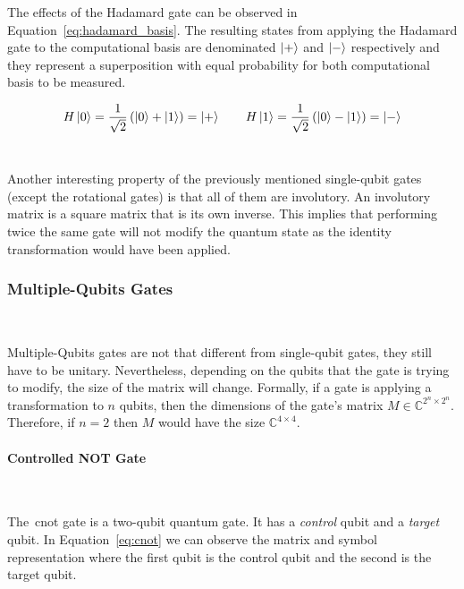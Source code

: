 The effects of the Hadamard gate can be observed in
Equation~\ref{eq:hadamard_basis}. The resulting states from applying
the Hadamard gate to the computational basis are denominated
\(\ket{+}\) and \(\ket{-}\) respectively and they represent
a superposition with equal probability for both computational 
basis to be measured. \

\begin{equation}\label{eq:hadamard_basis}
  H\ket{0} = \frac{1}{\sqrt{2}} \left( \ket{0} + \ket{1} \right) = \ket{+} \qquad
  H\ket{1} = \frac{1}{\sqrt{2}} \left( \ket{0} - \ket{1} \right) = \ket{-}
\end{equation} \

Another interesting property of the previously mentioned single-qubit
gates (except the rotational gates) is that all of them are involutory.
An involutory matrix is a square matrix that is its own inverse. This
implies that performing twice the same gate will not modify the quantum
state as the identity transformation would have been applied. \


\subsubsection{Multiple-Qubits Gates}\label{subsubsection:multiple_qubit} \

Multiple-Qubits gates are not that different from single-qubit gates,
they still have to be unitary. Nevertheless, depending on the qubits
that the gate is trying to modify, the size of the matrix will change.
Formally, if a gate is applying a transformation to \(n\) qubits, then
the dimensions of the gate's matrix \(M \in \mathbb{C}^{2^n \times 2^n}\).
Therefore, if \(n = 2\) then \(M\) would have the size
\(\mathbb{C}^{4 \times 4}\). \

\paragraph{Controlled NOT Gate} \

The~\ac{cnot} gate is a two-qubit quantum gate. It has a
\textit{control} qubit and a \textit{target} qubit. In
Equation~\ref{eq:cnot} we can observe the matrix and
symbol representation where the first qubit is the control
qubit and the second is the target qubit. \

